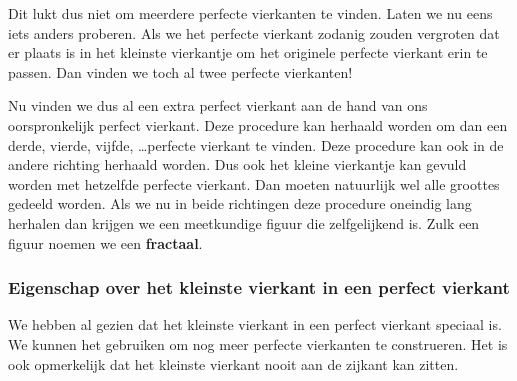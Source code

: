 

\begin{center}
  
\end{center}

Dit lukt dus niet om meerdere perfecte vierkanten te vinden. Laten we nu eens iets anders proberen. Als we het perfecte vierkant zodanig zouden vergroten dat er plaats is in het kleinste vierkantje om het originele perfecte vierkant erin te passen. Dan vinden we toch al twee perfecte vierkanten!




Nu vinden we dus al een extra perfect vierkant aan de hand van ons oorspronkelijk perfect vierkant. Deze procedure kan herhaald worden om dan een derde, vierde, vijfde, \ldots perfecte vierkant te vinden. Deze procedure kan ook in de andere richting herhaald worden. Dus ook het kleine vierkantje kan gevuld worden met hetzelfde perfecte vierkant. Dan moeten natuurlijk wel alle groottes gedeeld worden. Als we nu in beide richtingen deze procedure oneindig lang herhalen dan krijgen we een meetkundige figuur die zelfgelijkend is. Zulk een figuur noemen we een {\bf fractaal}.

\subsubsection{Eigenschap over het kleinste vierkant in een perfect vierkant}

We hebben al gezien dat het kleinste vierkant in een perfect vierkant speciaal is. We kunnen het gebruiken om nog meer perfecte vierkanten te construeren. Het is ook opmerkelijk dat het kleinste vierkant nooit aan de zijkant kan zitten.

